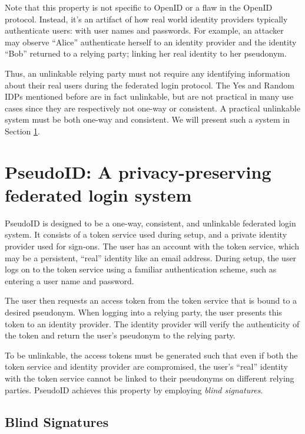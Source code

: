 \documentclass{llncs}
\begin{document}
Note that this property is not specific to OpenID or a flaw in the
OpenID protocol. Instead, it's an artifact of how real world identity
providers typically authenticate users: with user names and
passwords. For example, an attacker may observe ``Alice'' authenticate
herself to an identity provider and the identity ``Bob'' returned to a relying
party; linking her real identity to her pseudonym.

Thus, an unlinkable relying party must not require any identifying
information about their real users during the federated login
protocol. The Yes and Random IDPs mentioned before are in fact
unlinkable, but are not practical in many use cases since they are
respectively not one-way or consistent. A practical unlinkable system
must be both one-way and consistent. We will present such a system in
Section \ref{sec:pseudoid}.

\section{PseudoID: A privacy-preserving federated login system}
\label{sec:pseudoid}

PseudoID is designed to be a one-way, consistent, and unlinkable
federated login system. It consists of a token service used during
setup, and a private identity provider used for sign-ons. The user has
an account with the token service, which may be a persistent, ``real''
identity like an email address. During setup, the user logs on to the
token service using a familiar authentication scheme, such as entering
a user name and password.

The user then requests an access token from the token service that is
bound to a desired pseudonym. When logging into a relying party, the
user presents this token to an identity provider. The identity
provider will verify the authenticity of the token and return the
user's pseudonym to the relying party.

To be unlinkable, the access tokens must be generated such that even
if both the token service and identity provider are compromised, the
user's ``real'' identity with the token service cannot be linked to
their pseudonyms on different relying parties. PseudoID achieves this
property by employing \textit{blind signatures}.

\subsection{Blind Signatures}
\label{section:blind-sigs}
\end{document}
